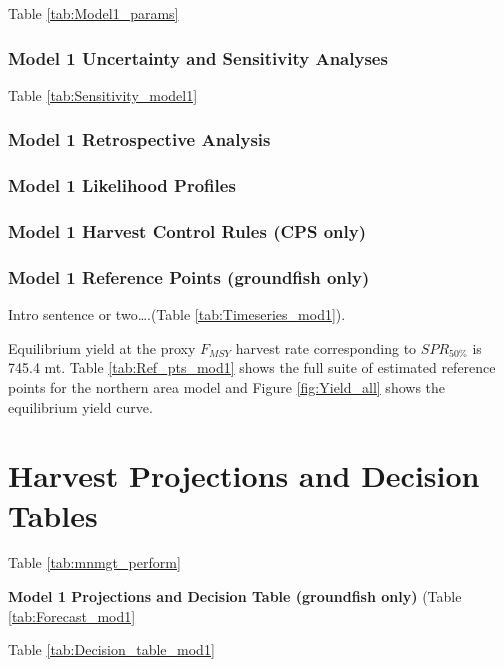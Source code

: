 \documentclass[12pt,]{article}
\begin{document}
Table \ref{tab:Model1_params}

\subsubsection{Model 1 Uncertainty and Sensitivity
Analyses}\label{model-1-uncertainty-and-sensitivity-analyses}

Table \ref{tab:Sensitivity_model1}

\subsubsection{Model 1 Retrospective
Analysis}\label{model-1-retrospective-analysis}

\subsubsection{Model 1 Likelihood
Profiles}\label{model-1-likelihood-profiles}

\subsubsection{Model 1 Harvest Control Rules (CPS
only)}\label{model-1-harvest-control-rules-cps-only}

\subsubsection{Model 1 Reference Points (groundfish
only)}\label{model-1-reference-points-groundfish-only}

Intro sentence or two\ldots{}.(Table \ref{tab:Timeseries_mod1}).

Equilibrium yield at the proxy \(F_{MSY}\) harvest rate corresponding to
\(SPR_{50\%}\) is 745.4 mt. Table \ref{tab:Ref_pts_mod1} shows the full
suite of estimated reference points for the northern area model and
Figure \ref{fig:Yield_all} shows the equilibrium yield curve.

\section{Harvest Projections and Decision
Tables}\label{harvest-projections-and-decision-tables}

Table \ref{tab:mnmgt_perform}

\textbf{Model 1 Projections and Decision Table (groundfish only)} (Table
\ref{tab:Forecast_mod1}

Table \ref{tab:Decision_table_mod1}
\end{document}
